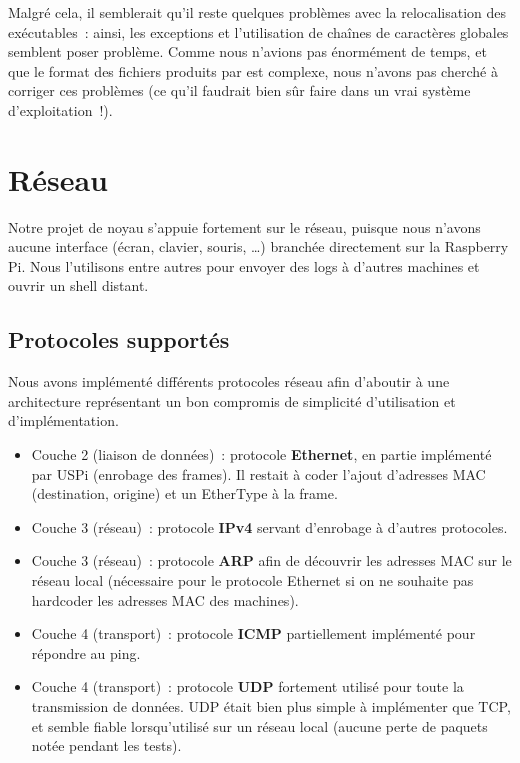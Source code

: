\documentclass[11pt,a4paper]{article}
\begin{document}
Malgré cela, il semblerait qu'il reste quelques problèmes avec la
relocalisation des exécutables~: ainsi, les exceptions et
l'utilisation de chaînes de caractères globales semblent poser
problème. Comme nous n'avions pas énormément de temps, et que le
format des fichiers produits par  est complexe, nous
n'avons pas cherché à corriger ces problèmes (ce qu'il faudrait bien
sûr faire dans un vrai système d'exploitation~!).

\section{Réseau}
Notre projet de noyau s'appuie fortement sur le réseau, puisque nous n'avons
aucune interface (écran, clavier, souris, \ldots) branchée directement sur la
Raspberry Pi. Nous l'utilisons entre autres pour envoyer des logs
à d'autres machines et ouvrir un shell distant.

\subsection{Protocoles supportés}
Nous avons implémenté différents protocoles réseau afin d'aboutir à une
architecture représentant un bon compromis de simplicité d'utilisation
et d'implémentation.
\begin{itemize}
	\item Couche 2 (liaison de données)~: protocole \textbf{Ethernet}, en partie
		implémenté par USPi (enrobage des frames). Il restait à coder
		l'ajout d'adresses MAC (destination, origine) et un EtherType à la
		frame.
	\item Couche 3 (réseau)~: protocole \textbf{IPv4} servant d'enrobage à
		d'autres protocoles.
	\item Couche 3 (réseau)~: protocole \textbf{ARP} afin de découvrir les
		adresses MAC sur le réseau local (nécessaire pour le protocole
		Ethernet si on ne souhaite pas hardcoder les adresses MAC des
		machines).
	\item Couche 4 (transport)~: protocole \textbf{ICMP} partiellement
		implémenté pour répondre au ping.
	\item Couche 4 (transport)~: protocole \textbf{UDP} fortement utilisé
		pour toute la transmission de données. UDP était bien plus simple à
		implémenter que TCP, et semble fiable lorsqu'utilisé sur un réseau
		local (aucune perte de paquets notée pendant les tests).
\end{itemize}
\end{document}
